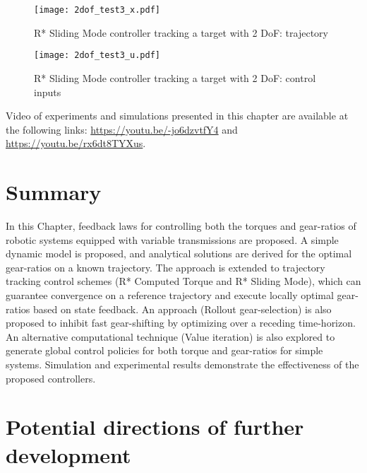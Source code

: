 %
\begin{figure}[htp]
	\centering
		\texttt{[image: 2dof\_test3\_x.pdf]}
	\caption{R* Sliding Mode controller tracking a target with 2 DoF: trajectory}
	\label{fig:exp_traj_2dof_x}
\end{figure}
%

%
\begin{figure}[htp]
	\centering
		\texttt{[image: 2dof\_test3\_u.pdf]}
	\caption{R* Sliding Mode controller tracking a target with 2 DoF: control inputs}
	\label{fig:exp_traj_2dof_u}
\end{figure}
%

Video of experiments and simulations presented in this chapter are available at the following links: \href{https://youtu.be/-jo6dzvtfY4}{https://youtu.be/-jo6dzvtfY4} and \href{https://youtu.be/rx6dt8TYXus}{https://youtu.be/rx6dt8TYXus}.



\newpage

\section{Summary}

In this Chapter, feedback laws for controlling both the torques and gear-ratios of robotic systems equipped with variable transmissions are proposed. A simple dynamic model is proposed, and analytical solutions are derived for the optimal gear-ratios on a known trajectory. The approach is extended to trajectory tracking control schemes (R* Computed Torque and R* Sliding Mode), which can guarantee convergence on a reference trajectory and execute locally optimal gear-ratios based on state feedback. An approach (Rollout gear-selection) is also proposed to inhibit fast gear-shifting by optimizing over a receding time-horizon. An alternative computational technique (Value iteration) is also explored to generate global control policies for both torque and gear-ratios for simple systems. Simulation and experimental results demonstrate the effectiveness of the proposed controllers.

\section{Potential directions of further development}

